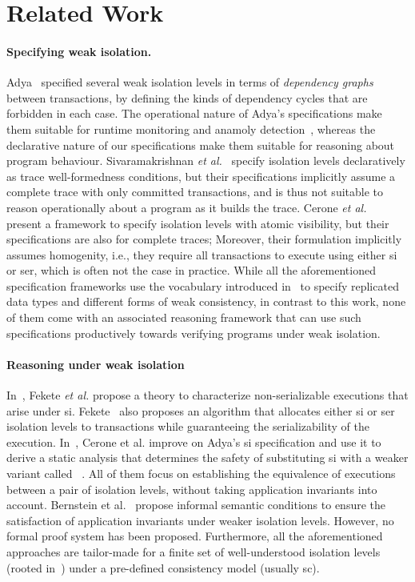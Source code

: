 \section{Related Work}
\label{sec:relatedwork}

\paragraph{Specifying weak isolation.}
Adya~\cite{adyaphd} specified several weak isolation levels in terms
of \emph{dependency graphs} between transactions, by defining the
kinds of dependency cycles that are forbidden in each case. The
operational nature of Adya's specifications make them suitable for
runtime monitoring and anamoly
detection~\cite{kemmevldb,feketesigmod08,pssi2011}, whereas the
declarative nature of our specifications make them suitable for
reasoning about program behaviour. Sivaramakrishnan \emph{et
  al.}~\cite{pldi15} specify isolation levels declaratively as trace
well-formedness conditions, but their specifications implicitly assume
a complete trace with only committed transactions, and is thus not
suitable to reason operationally about a program as it builds the
trace. Cerone \emph{et al.}~\cite{gotsmanconcur15} present a framework
to specify isolation levels with atomic visibility, but their
specifications are also for complete traces; Moreover, their
formulation implicitly assumes homogenity, i.e., they require all
transactions to execute using either {\sc si} or {\sc ser}, which is
often not the case in practice. While all the aforementioned
specification frameworks use the vocabulary introduced
in~\cite{burckhardt14} to specify replicated data types and different
forms of weak consistency, in contrast to this work, none of them come
with an associated reasoning framework that can use such
specifications productively towards verifying programs under weak
isolation.

\paragraph{Reasoning under weak isolation} In~\cite{feketessi}, Fekete
\emph{et al.} propose a theory to characterize non-serializable executions
that arise under {\sc si}. Fekete~\cite{fekete2005} also proposes an
algorithm that allocates either {\sc si} or {\sc ser} isolation levels
to transactions while guaranteeing the serializability of the
execution. In~\cite{gotsmanpodc16}, Cerone et al. improve on Adya's
{\sc si} specification and use it to derive a static analysis that
determines the safety of substituting {\sc si} with a weaker variant
called ~\cite{psi}. All of them focus
on establishing the equivalence of executions between a pair of
isolation levels, without taking application invariants into account.
Bernstein et al.~\cite{bern2000} propose informal semantic conditions
to ensure the satisfaction of application invariants under weaker
isolation levels.  However, no formal proof system has been proposed.
Furthermore, all the aforementioned approaches are tailor-made for a
finite set of well-understood isolation levels (rooted
in~\cite{berenson}) under a pre-defined consistency model (usually
{\sc sc}). 

